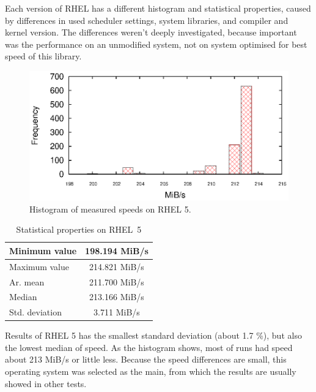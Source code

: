 \par{
Each version of RHEL has a different histogram and statistical properties, caused by differences in used scheduler settings, system libraries, and compiler and kernel version. The differences weren't deeply investigated, because important was the performance on an unmodified system, not on system optimised for best speed of this library. 
}
\begin{figure}[h!]
  \centering
 \includegraphics[width=12cm]{fig/tests/scattering_rhel5.eps} %
\caption{Histogram of measured speeds on RHEL 5.}
\label{fig:testing:stability-r5}
\end{figure}

\begin{table}[h!]
\begin{center}
\begin{tabular}{|l|c|}
  \hline
  Minimum value& 198.194 MiB/s\\
  \hline
  Maximum value& 214.821 MiB/s\\ 
  \hline
  Ar. mean & 211.700 MiB/s\\
  \hline
  Median & 213.166 MiB/s\\
  \hline
  Std. deviation & 3.711 MiB/s\\
  \hline
\end{tabular}
\caption{Statistical properties on RHEL~5}
\label{tab:testing:stability-stat-r5}
\end{center}
\end{table}

\par{
Results of RHEL 5 has the smallest standard deviation (about 1.7 \%), but also the lowest median of speed. As the histogram shows, most of runs had speed about 213 MiB/s or little less. Because the speed differences are small, this operating system was selected as the main, from which the results are usually showed in other tests.
}

